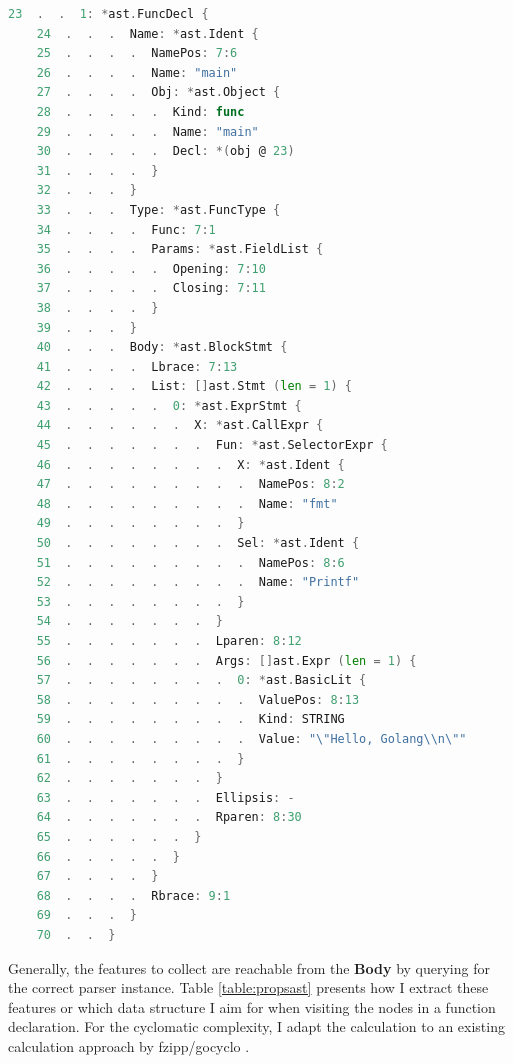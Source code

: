 \documentclass{seal_thesis}
\begin{document}
\begin{minipage}{0.95\linewidth}
\begin{lstlisting}[caption=Sample output from yuroyoro's Ast Viewer \cite{goastviewer}., label={yuroyoro}, language=Go, frame=single, ]
	23  .  .  1: *ast.FuncDecl {
	24  .  .  .  Name: *ast.Ident {
	25  .  .  .  .  NamePos: 7:6
	26  .  .  .  .  Name: "main"
	27  .  .  .  .  Obj: *ast.Object {
	28  .  .  .  .  .  Kind: func
	29  .  .  .  .  .  Name: "main"
	30  .  .  .  .  .  Decl: *(obj @ 23)
	31  .  .  .  .  }
	32  .  .  .  }
	33  .  .  .  Type: *ast.FuncType {
	34  .  .  .  .  Func: 7:1
	35  .  .  .  .  Params: *ast.FieldList {
	36  .  .  .  .  .  Opening: 7:10
	37  .  .  .  .  .  Closing: 7:11
	38  .  .  .  .  }
	39  .  .  .  }
	40  .  .  .  Body: *ast.BlockStmt {
	41  .  .  .  .  Lbrace: 7:13
	42  .  .  .  .  List: []ast.Stmt (len = 1) {
	43  .  .  .  .  .  0: *ast.ExprStmt {
	44  .  .  .  .  .  .  X: *ast.CallExpr {
	45  .  .  .  .  .  .  .  Fun: *ast.SelectorExpr {
	46  .  .  .  .  .  .  .  .  X: *ast.Ident {
	47  .  .  .  .  .  .  .  .  .  NamePos: 8:2
	48  .  .  .  .  .  .  .  .  .  Name: "fmt"
	49  .  .  .  .  .  .  .  .  }
	50  .  .  .  .  .  .  .  .  Sel: *ast.Ident {
	51  .  .  .  .  .  .  .  .  .  NamePos: 8:6
	52  .  .  .  .  .  .  .  .  .  Name: "Printf"
	53  .  .  .  .  .  .  .  .  }
	54  .  .  .  .  .  .  .  }
	55  .  .  .  .  .  .  .  Lparen: 8:12
	56  .  .  .  .  .  .  .  Args: []ast.Expr (len = 1) {
	57  .  .  .  .  .  .  .  .  0: *ast.BasicLit {
	58  .  .  .  .  .  .  .  .  .  ValuePos: 8:13
	59  .  .  .  .  .  .  .  .  .  Kind: STRING
	60  .  .  .  .  .  .  .  .  .  Value: "\"Hello, Golang\\n\""
	61  .  .  .  .  .  .  .  .  }
	62  .  .  .  .  .  .  .  }
	63  .  .  .  .  .  .  .  Ellipsis: -
	64  .  .  .  .  .  .  .  Rparen: 8:30
	65  .  .  .  .  .  .  }
	66  .  .  .  .  .  }
	67  .  .  .  .  }
	68  .  .  .  .  Rbrace: 9:1
	69  .  .  .  }
	70  .  .  }
\end{lstlisting}
\end{minipage}

\noindent Generally, the features to collect are reachable from the \textbf{Body} by querying for the correct parser instance. Table \ref{table:propsast} presents how I extract these features or which data structure I aim for when visiting the nodes in a function declaration. For the cyclomatic complexity, I adapt the calculation to an existing calculation approach by fzipp/gocyclo \cite{gocyclo}. 
\end{document}
